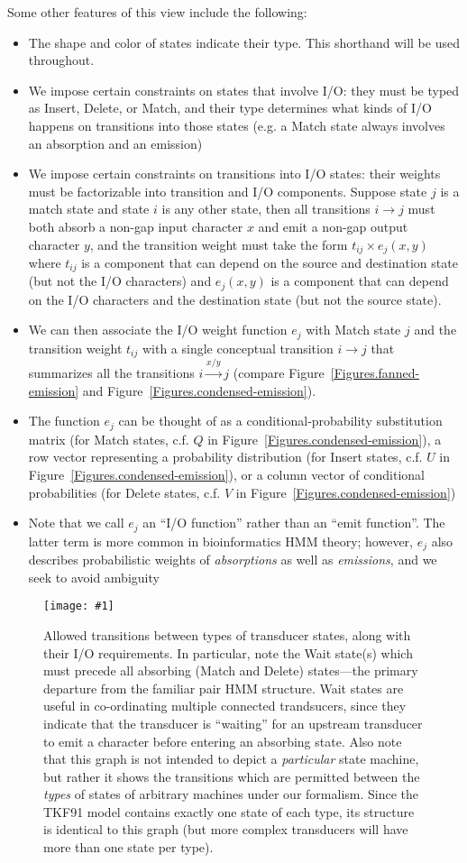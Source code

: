 \documentclass{article}
\newcommand{\figref}[1]{Figure~\ref{Figures.#1}}
\newcommand{\figlabel}[1]{\label{Figures.#1}}
\newcommand{\easyfig}[4]{
\begin{figure}
\texttt{[image: \#1]}
\caption{ \figlabel{#3} #4}
\end{figure}}
\newcommand{\pngfig}[2]{\easyfig{#1.png}{}{#1}{#2}}
\begin{document}
Some other features of this view include the following:
\begin{itemize}
\item The shape and color of states indicate their type.  This shorthand will be used throughout.
\item We impose certain constraints on states that involve I/O:
 they must be typed  as Insert, Delete, or Match, and
 their type determines what kinds of I/O happens on transitions into those states (e.g. a Match state always involves an absorption and an emission)
\item We impose certain constraints on transitions into I/O states:
 their weights must be factorizable into transition and I/O components.
 Suppose state $j$ is a match state and state $i$ is any other state,
 then all transitions $i \to j$ must both absorb a non-gap input character $x$
 and emit a non-gap output character $y$,
 and the transition weight must take the form $t_{ij} \times e_j(x,y)$
 where $t_{ij}$ is a component that can depend on the source and destination state
  (but not the I/O characters)
 and $e_j(x,y)$ is a component that can depend on the I/O characters and the destination state
  (but not the source state).
\item We can then associate the I/O weight function $e_j$ with Match state $j$
 and the transition weight $t_{ij}$ with a single conceptual transition $i \to j$
 that summarizes all the transitions $i \stackrel{x/y}{\to} j$
 (compare \figref{fanned-emission} and \figref{condensed-emission}).
\item The function $e_j$ can be thought of as a conditional-probability substitution matrix
 (for Match states, c.f. $Q$ in \figref{condensed-emission}),
a row vector representing a probability distribution
 (for Insert states, c.f. $U$ in \figref{condensed-emission}),
or a column vector of conditional probabilities
 (for Delete states, c.f. $V$ in \figref{condensed-emission})
\item Note that we call $e_j$ an ``I/O function'' rather than an ``emit function''.
The latter term is more common in bioinformatics HMM theory;
however, $e_j$ also describes probabilistic weights of {\em absorptions} as well as {\em emissions},
and we seek to avoid ambiguity
\end{itemize}

\pngfig{transitions}
{Allowed transitions between types of transducer states, along with their I/O requirements.
In particular, note the Wait state(s) which must precede all 
absorbing (Match and Delete) states---the primary departure from the familiar pair HMM
structure.  
Wait states are useful in co-ordinating multiple connected trandsucers, since they indicate that
the transducer is ``waiting'' for an upstream transducer to emit a character before entering an
absorbing state. 
Also note that this graph is not intended to depict a {\em particular} state machine, 
but rather it shows the transitions which are permitted between the {\em types}
of states of arbitrary machines under our formalism.  
Since the TKF91 model contains exactly one state of each type,
 its structure is identical to this graph 
(but more complex transducers will have more than one state per type).  }
\end{document}
